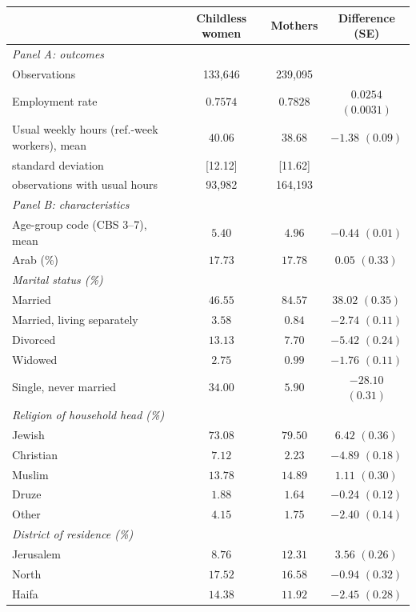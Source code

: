 \begin{tabular}{lccc}
\toprule
 & Childless women & Mothers & Difference (SE) \\
\midrule
\multicolumn{4}{l}{\emph{Panel A: outcomes}} \\
Observations & 133{,}646 & 239{,}095 &  \\
Employment rate & $0.7574$ & $0.7828$ & $0.0254$ $(0.0031)$ \\
Usual weekly hours (ref.-week workers), mean & $40.06$ & $38.68$ & $-1.38$ $(0.09)$ \\
\quad standard deviation & [12.12] & [11.62] &  \\
\quad observations with usual hours & 93{,}982 & 164{,}193 &  \\
\midrule
\multicolumn{4}{l}{\emph{Panel B: characteristics}} \\
Age-group code (CBS 3--7), mean & $5.40$ & $4.96$ & $-0.44$ $(0.01)$ \\
Arab (\%) & $17.73$ & $17.78$ & $0.05$ $(0.33)$ \\
\addlinespace
\emph{Marital status (\%)} &  &  &  \\
\quad Married & $46.55$ & $84.57$ & $38.02$ $(0.35)$ \\
\quad Married, living separately & $3.58$ & $0.84$ & $-2.74$ $(0.11)$ \\
\quad Divorced & $13.13$ & $7.70$ & $-5.42$ $(0.24)$ \\
\quad Widowed & $2.75$ & $0.99$ & $-1.76$ $(0.11)$ \\
\quad Single, never married & $34.00$ & $5.90$ & $-28.10$ $(0.31)$ \\
\addlinespace
\emph{Religion of household head (\%)} &  &  &  \\
\quad Jewish & $73.08$ & $79.50$ & $6.42$ $(0.36)$ \\
\quad Christian & $7.12$ & $2.23$ & $-4.89$ $(0.18)$ \\
\quad Muslim & $13.78$ & $14.89$ & $1.11$ $(0.30)$ \\
\quad Druze & $1.88$ & $1.64$ & $-0.24$ $(0.12)$ \\
\quad Other & $4.15$ & $1.75$ & $-2.40$ $(0.14)$ \\
\addlinespace
\emph{District of residence (\%)} &  &  &  \\
\quad Jerusalem & $8.76$ & $12.31$ & $3.56$ $(0.26)$ \\
\quad North & $17.52$ & $16.58$ & $-0.94$ $(0.32)$ \\
\quad Haifa & $14.38$ & $11.92$ & $-2.45$ $(0.28)$ \\

\end{tabular}
